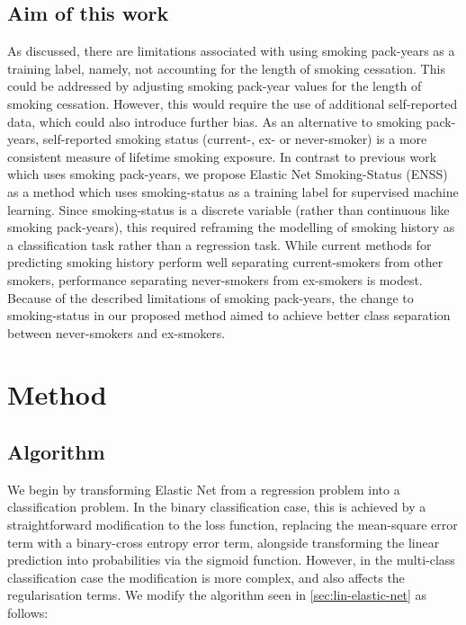 \documentclass{article} %
\begin{document}
\subsection{Aim of this work}

As discussed, there are limitations associated with using smoking pack-years as a training label, namely, not accounting for the length of smoking cessation. This could be addressed by adjusting smoking pack-year values for the length of smoking cessation. However, this would require the use of additional self-reported data, which could also introduce further bias. As an alternative to smoking pack-years, self-reported smoking status (current-, ex- or never-smoker) is a more consistent measure of lifetime smoking exposure. In contrast to previous work which uses smoking pack-years, we propose Elastic Net Smoking-Status (ENSS) as a method which uses smoking-status as a training label for supervised machine learning.  Since smoking-status is a discrete variable (rather than continuous like smoking pack-years), this required reframing the modelling of smoking history as a classification task rather than a regression task. While current methods for predicting smoking history perform well separating current-smokers from other smokers, performance separating never-smokers from ex-smokers is modest. Because of the described limitations of smoking pack-years, the change to smoking-status in our proposed method aimed to achieve better class separation between never-smokers and ex-smokers.


\newpage
\section{Method}

\subsection{Algorithm} \label{sec:algorithm}
We begin by transforming Elastic Net from a regression problem into a classification problem. In the binary classification case, this is achieved by a straightforward modification to the loss function, replacing the mean-square error term with a binary-cross entropy error term, alongside transforming the linear prediction into probabilities via the sigmoid function. However, in the multi-class classification case the modification is more complex, and also affects the regularisation terms. We modify the algorithm seen in \ref{sec:lin-elastic-net} as follows:
\end{document}
